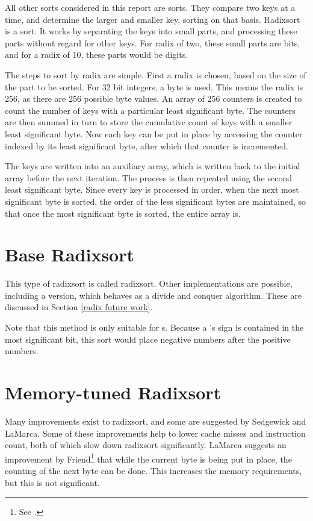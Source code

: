 \label{radix}

All other sorts considered in this report are  sorts.
They compare two keys at a time, and determine the larger and smaller key,
sorting on that basis. Radixsort is a  sort. It works by
separating the keys into small parts, and processing these parts without
regard for other keys. For radix of two, these small parts are bits, and for a
radix of 10, these parts would be digits. 

The steps to sort by radix are simple. First a radix is chosen, based on the
size of the part to be sorted. For 32 bit integers, a byte is used. This means
the radix is 256, as there are 256 possible byte values. An array of 256
counters is created to count the number of keys with a particular least
significant byte. The counters are then summed in turn to store the cumulative
count of keys with a smaller least significant byte. Now each key can be put in
place by accessing the counter indexed by its least significant byte, after
which that counter is incremented.

The keys are written into an auxiliary array, which is written back to the initial
array before the next iteration. The process is then repeated using the second
least significant byte.  Since every key is processed in order, when the next
most significant byte is sorted, the order of the less significant bytes are
maintained, so that once the most significant byte is sorted, the entire array
is.

\section{Base Radixsort}

This type of radixsort is called  radixsort.
Other implementations are possible, including a 
version, which behaves as a divide and conquer algorithm. These are discussed
in Section \ref{radix future work}.

Note that this method is only suitable for s. Because a
's sign is contained in the most significant bit, this sort would
place negative numbers after the positive numbers.

\section{Memory-tuned Radixsort}
Many improvements exist to radixsort, and some are suggested by Sedgewick and
LaMarca. Some of these improvements help to lower cache misses and instruction
count, both of which slow down radixsort significantly. LaMarca suggests an
improvement by Friend\footnote{See \cite{Friend56:152}.} that while the current
byte is being put in place, the counting of the next byte can be done. This
increases the memory requirements, but this is not significant.

